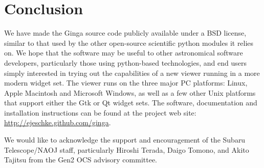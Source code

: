 \section{Conclusion}
We have made the Ginga source code publicly available under a BSD license, similar to that used by the other open-source scientific python modules it relies on. We hope that the software may be useful to other astronomical software developers, particularly those using python-based technologies, and end users simply interested in trying out the capabilities of a new viewer running in a more modern widget set.  The viewer runs on the three major PC platforms: Linux, Apple Macintosh and Microsoft Windows, as well as a few other Unix platforms that support either the Gtk or Qt widget sets. The software, documentation and installation instructions can be found at the project web site: \url{http://ejeschke.github.com/ginga}.

\acknowledgements We would like to acknowledge the support and encouragement of the Subaru Telescope/NAOJ staff, particularly Hiroshi Terada, Daigo Tomono, and Akito Tajitsu from the Gen2 OCS advisory committee. 


